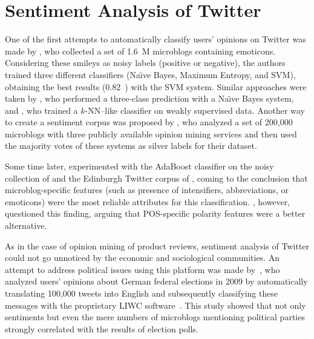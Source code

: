 \section{Sentiment Analysis of Twitter}\label{snt:subsec:intro:saot}

One of the first attempts to automatically classify users' opinions on
Twitter was made by \citet{Go:09}, who collected a set of 1.6~M
microblogs containing emoticons.  Considering these smileys as noisy
labels (positive or negative), the authors trained three different
classifiers (Na\"{\i}ve Bayes, Maximum Entropy, and SVM), obtaining
the best results (0.82~\F{}) with the SVM system.  Similar approaches
were taken by \citet{Pak:10}, who performed a three-class prediction
with a Na\"{\i}ve Bayes system, and \citet{Davidov:10}, who trained a
$k$-NN--like classifier on weakly supervised data. Another way to
create a sentiment corpus was proposed by \citet{Barbosa:10}, who
analyzed a set of 200,000 microblogs with three publicly available
opinion mining services and then used the majority votes of these
systems as silver labels for their dataset.

Some time later, \citet{Kouloumpis:11} experimented with the AdaBoost
classifier on the noisy collection of \citet{Go:09} and the Edinburgh
Twitter corpus of \citet{Petrovic:10}, coming to the conclusion that
microblog-specific features (such as presence of intensifiers,
abbreviations, or emoticons) were the most reliable attributes for
this classification.  \citet{Agarwal:11}, however, questioned this
finding, arguing that POS-specific polarity features were a better
alternative.

As in the case of opinion mining of product reviews, sentiment
analysis of Twitter could not go unnoticed by the economic and
sociological communities.  An attempt to address political issues
using this platform was made by~\citet{Tumasjan:10}, who analyzed
users' opinions about German federal elections in 2009 by
automatically translating 100,000 tweets into English and subsequently
classifying these messages with the proprietary LIWC
software~\cite{Pannebaker:07}.  This study showed that not only
sentiments but even the mere numbers of microblogs mentioning
political parties strongly correlated with the results of election
polls.



